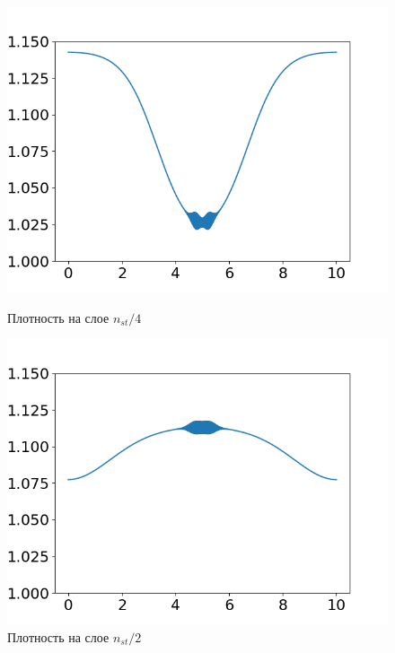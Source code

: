 \documentclass[12pt,a4paper]{article}
\begin{document}
\begin{figure}[h]
	\begin{minipage}[h]{0.47\linewidth}
		\centering
		\includegraphics[width=1\linewidth]{pics/task2/14h_1.png} 
		\caption{Плотность на слое $n_{st} / 4$}
	\end{minipage}
	\hfill
	\begin{minipage}[h]{0.47\linewidth}
		\centering
		\includegraphics[width=1\linewidth]{pics/task2/24h_1.png} 
		\caption{Плотность на слое $n_{st} / 2$}
	\end{minipage}
	\vfill
	\begin{minipage}[h]{0.47\linewidth}
		\centering

\end{minipage}
\end{figure}
\end{document}
